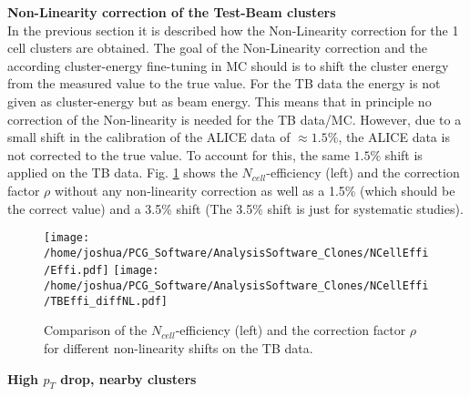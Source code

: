 \documentclass[ALICE]{ALICE_analysis_notes}
\begin{document}
\textbf{Non-Linearity correction of the Test-Beam clusters}\\
In the previous section it is described how the Non-Linearity correction for the 1 cell clusters are obtained. The goal of the Non-Linearity correction and the according cluster-energy fine-tuning in MC should is to shift the cluster energy from the measured value to the true value. For the TB data the energy is not given as cluster-energy but as beam energy. This means that in principle no correction of the Non-linearity is needed for the TB data/MC. However, due to a small shift in the calibration of the ALICE data of $\approx 1.5\%$, the ALICE data is not corrected to the true value. To account for this, the same $1.5\%$ shift is applied on the TB data. Fig. \ref{fig:NonLinTB} shows the $N_{cell}$-efficiency (left) and the correction factor $\rho$ without any non-linearity correction as well as a 1.5\% (which should be the correct value) and a 3.5\% shift (The 3.5\% shift is just for systematic studies).
\begin{figure}[h!]
	\centering
	\texttt{[image: /home/joshua/PCG\_Software/AnalysisSoftware\_Clones/NCellEffi/Effi.pdf]}
	\texttt{[image: /home/joshua/PCG\_Software/AnalysisSoftware\_Clones/NCellEffi/TBEffi\_diffNL.pdf]}
	\caption{ Comparison of the $N_{cell}$-efficiency (left) and the correction factor $\rho$ for different non-linearity shifts on the TB data. }
	\label{fig:NonLinTB}
\end{figure}


\textbf{High $p_{T}$ drop, nearby clusters}\\
\end{document}
